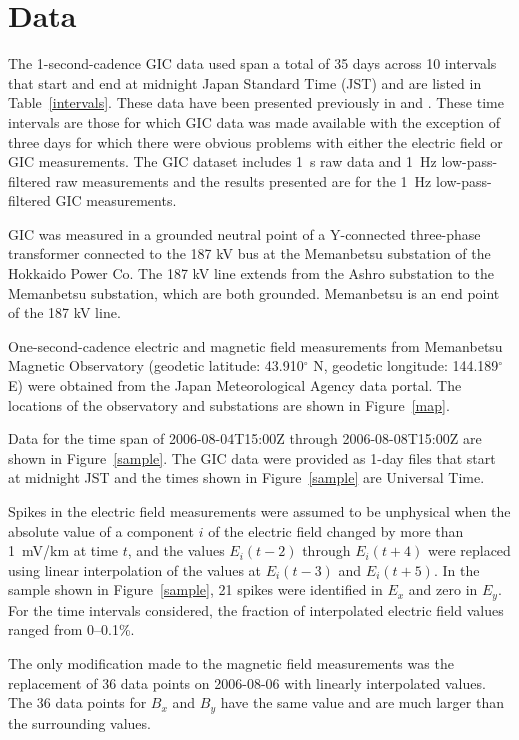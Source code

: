 \documentclass[draft,linenumbers]{agujournal2018}
\begin{document}
\section{Data}

The 1-second-cadence GIC data used span a total of 35 days across 10 intervals that start and end at midnight Japan Standard Time (JST) and are listed in Table~\ref{intervals}. These data have been presented previously in \citet{Watari2009} and \cite{Watari2015}. These time intervals are those for which GIC data was made available with the exception of three days for which there were obvious problems with either the electric field or GIC measurements. The GIC dataset includes 1~s raw data and 1~Hz low-pass-filtered raw measurements and the results presented are for the 1~Hz low-pass-filtered GIC measurements.

GIC was measured in a grounded neutral point of a Y-connected three-phase transformer connected to the 187 kV bus at the Memanbetsu substation of the Hokkaido Power Co. The 187 kV line extends from the Ashro substation to the Memanbetsu substation, which are both grounded. Memanbetsu is an end point of the 187 kV line.

One-second-cadence electric and magnetic field measurements from Memanbetsu Magnetic Observatory (geodetic latitude: 43.910$^{\circ}$ N, geodetic longitude: 144.189$^{\circ}$ E) were obtained from the Japan Meteorological Agency data portal. The locations of the observatory and substations are shown in Figure~\ref{map}.

Data for the time span of 2006-08-04T15:00Z through 2006-08-08T15:00Z are shown in Figure~\ref{sample}. The GIC data were provided as 1-day files that start at midnight JST and the times shown in Figure~\ref{sample} are Universal Time.

Spikes in the electric field measurements were assumed to be unphysical when the absolute value of a component $i$ of the electric field changed by more than 1~mV/km at time $t$, and the values $E_i(t-2)$ through $E_i(t+4)$ were replaced using linear interpolation of the values at $E_i(t-3)$ and $E_i(t + 5)$. In the sample shown in Figure~\ref{sample}, 21 spikes were identified in $E_x$ and zero in $E_y$. For the time intervals considered, the fraction of interpolated electric field values ranged from 0--0.1\%.

The only modification made to the magnetic field measurements was the replacement of 36 data points on 2006-08-06 with linearly interpolated values. The 36 data points for $B_x$ and $B_y$ have the same value and are much larger than the surrounding values.
\end{document}
